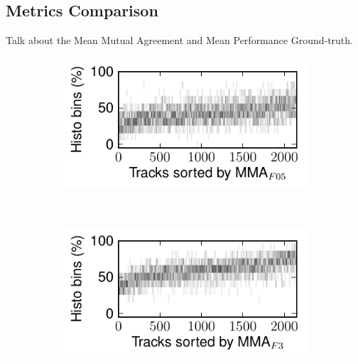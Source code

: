 \documentclass{article}
\begin{document}
\subsection{Metrics Comparison}

Talk about the Mean Mutual Agreement and Mean Performance Ground-truth\cite{Holzapfel2012}.

\begin{figure}
      \centering
      \begin{subfigure}[b]{0.25\textwidth}
              \includegraphics[width=\textwidth]{plots/histo-F05.pdf}
              \caption{}
              \label{fig:histo-F05}
      \end{subfigure}%
      ~ 
      \begin{subfigure}[b]{0.25\textwidth}
              \includegraphics[width=\textwidth]{plots/histo-F3.pdf}
              \caption{}
              \label{fig:histo-F3}
      \end{subfigure}%
       

\end{figure}
\end{document}
